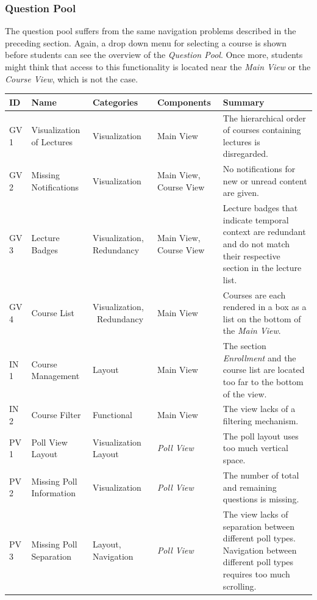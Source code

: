 \subsubsection{Question Pool}

The question pool suffers from the same navigation problems described in the preceding section. Again, a drop down menu for selecting a course is shown before students can see the overview of the \emph{Question Pool}. Once more, students might think that access to this functionality is located near the \emph{Main View} or the \emph{Course View}, which is not the case.
\cleardoublepage
\renewcommand*{\arraystretch}{1.4}
\begin{longtable}{ | p{1.1cm} | p{2cm} | p{2cm} | p{2.5cm} | p{5.5cm} |}
	\hline
	ID & Name & Categories & Components & Summary \\ \hline \hline
	GV 1 & Visualization of Lectures & Visualization & Main View & The hierarchical order of courses containing lectures is disregarded. \\ \hline
	GV 2 & Missing Notifications & Visualization & Main View, \newline Course View & No notifications for new or unread content are given. \\ \hline
	GV 3 & Lecture Badges & Visualization, \newline Redundancy & Main View, \newline Course View & Lecture badges that indicate temporal context are redundant and do not match their respective section in the lecture list. \\ \hline
	GV 4 & Course List & Visualization, \ Redundancy & Main View & Courses are each rendered in a box as a list on the bottom of the \emph{Main View}. \\ \hline
	IN 1 & Course Management & Layout & Main View & The section \emph{Enrollment} and the course list are located too far to the bottom of the view. \\ \hline
	IN 2 & Course Filter & Functional & Main View & The view lacks of a filtering mechanism. \\ \hline
	PV 1 & Poll View Layout & Visualization \newline Layout & \emph{Poll View} & The poll layout uses too much vertical space. \\ \hline
	PV 2 & Missing Poll Information & Visualization & \emph{Poll View} & The number of total and remaining questions is missing. \\ \hline
	PV 3 & Missing Poll Separation & Layout, \newline Navigation & \emph{Poll View} & The view lacks of separation between different poll types. Navigation between different poll types requires too much scrolling. \\ \hline

\end{longtable}
